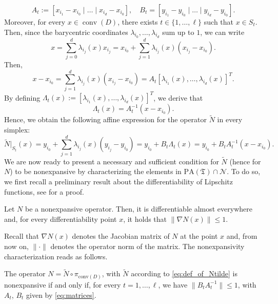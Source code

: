 \documentclass[onefignum,onetabnum]{siamonline250211}
\newcommand{\N}{\mathcal{N}}
\newcommand{\conv}{\operatorname{conv}}
\begin{document}
\begin{equation}\label{eq:matrices}
A_t:=[x_{i_1}-x_{i_0}\mid\dots \mid x_{i_d}-x_{i_0}], \quad B_t=[y_{i_1}-y_{i_0}\mid\ldots \mid y_{i_d}-y_{i_0}].
\end{equation}
Moreover, for every $x\in\conv(D)$, there exists $t\in\{1,\ldots, \ell\}$ such that $x\in S_t$. Then, since the barycentric coordinates $\lambda_{i_0},\ldots, \lambda_{i_d}$ sum up to $1$, we can write
$$
x=\sum_{j=0}^d\lambda_{i_j}(x)x_{i_j}= x_{i_0} + \sum_{j=1}^d\lambda_{i_j}(x)(x_{i_j}-x_{i_0}).
$$
Then,
$$
x-x_{i_0}=\sum_{j=1}^d\lambda_{i_j}(x)(x_{i_j}-x_{i_0})=A_t[\lambda_{i_1}(x),\dots,\lambda_{i_d}(x)]^T.
$$
By defining $\Lambda_t(x):=[\lambda_{i_1}(x),\dots,\lambda_{i_d}(x)]^T$, we derive that
$$
\Lambda_t(x)=A_t^{-1}(x-x_{i_0}).
$$
Hence, we obtain the following affine expression for the operator $\tilde{N}$ in every simplex:
\begin{equation}\label{eq:piecewise}
\tilde{N}\vert_{S_t} (x)=y_{i_0} + \sum_{j=1}^d\lambda_{i_j}(x) (y_{i_j}-y_{i_0})= y_{i_0} + B_t\Lambda_t(x) =  y_{i_0} + B_tA_t^{-1}(x-x_{i_0}).
\end{equation}
We are now ready to present a necessary and sufficient condition for $\tilde{N}$ (hence for $N$) to be nonexpansive by characterizing the elements in $\mathrm{PA}(\mathfrak{T}) \cap \N$. To do so, we first recall a preliminary result about the differentiability of Lipschitz functions, see \cite{Heinonen2005} for a proof.
\begin{prop}\label{prop:aediff}
Let $N$ be a nonexpansive operator. Then, it is differentiable almost everywhere and, for every differentiability point $x$, it holds that $\|\nabla N(x)\|\leq 1$.
\end{prop}
Recall that $\nabla N(x)$ denotes the Jacobian matrix of $N$ at the point $x$ and, from now on, $\|\cdot\|$ denotes the operator norm of the matrix. The nonexpansivity characterization reads as follows.
\begin{theorem}\label{thm:1lip}
The operator $N=\tilde{N}\circ\pi_{\mathrm{conv}(D)}$, with $\tilde N$ according to \cref{eq:def_of_Ntilde} is nonexpansive if and only if, for every $t=1,\ldots, \ell$, we have $\|B_tA_t^{-1}\|\leq 1$, with $A_t$, $B_t$ given by \cref{eq:matrices}.
\end{theorem}
\end{document}
